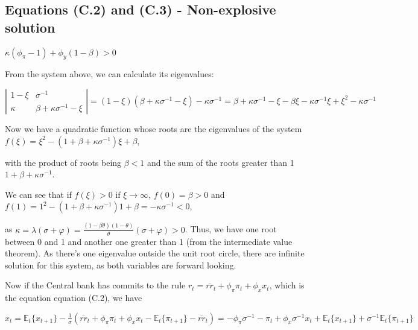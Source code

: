 \documentclass[
]{article}
\begin{document}
\vspace{12pt}

\hypertarget{equations-c.2-and-c.3---non-explosive-solution}{%
\subsection{Equations (C.2) and (C.3) - Non-explosive
solution}\label{equations-c.2-and-c.3---non-explosive-solution}}

\(\kappa (\phi_\pi-1)+\phi_y(1-\beta)>0\)

\vspace{8pt}

From the system above, we can calculate its eigenvalues:

\(\left| \begin{matrix} 1-\xi & \sigma^{-1} \\ \kappa & \beta +\kappa \sigma^{-1}-\xi \end{matrix} \right|=(1-\xi)(\beta +\kappa \sigma^{-1}-\xi)-\kappa \sigma^{-1}= \beta +\kappa \sigma^{-1}-\xi - \beta \xi -\kappa \sigma^{-1} \xi+\xi^2 -\kappa \sigma^{-1}\)

Now we have a quadratic function whose roots are the eigenvalues of the
system \(f(\xi)=\xi^2-(1+\beta+\kappa \sigma^{-1})\xi+\beta\),

with the product of roots being \(\beta<1\) and the sum of the roots
greater than 1 \(1+\beta+\kappa \sigma^{-1}\).

We can see that if \(f(\xi)>0\) if \(\xi \rightarrow \infty\),
\(f(0)=\beta>0\) and
\(f(1)=1^2-(1+\beta+\kappa \sigma^{-1})1+\beta=-\kappa \sigma^{-1}<0\),

as
\(\displaystyle \kappa=\lambda(\sigma+\varphi)=\frac{(1-\beta \theta)(1-\theta)}{\theta}(\sigma+\varphi)>0\).
Thus, we have one root between 0 and 1 and another one greater than 1
(from the intermediate value theorem). As there's one eigenvalue outside
the unit root circle, there are infinite solution for this system, as
both variables are forward looking.

Now if the Central bank has commits to the rule
\(r_t=\overline{rr}_t+\phi_\pi \pi_t+\phi_x x_t\), which is the equation
equation (C.2), we have

\(\displaystyle x_t = \mathbb{E}_t\{x_{t+1}\} -\frac{1}{\sigma}(\overline{rr}_t+\phi_\pi \pi_{t}+\phi_x x_t-\mathbb{E}_t\{\pi_{t+1}\} -\overline{rr}_t)= -\phi_\pi \sigma^{-1} -\pi_{t}+\phi_x \sigma^{-1} x_t + \mathbb{E}_t\{x_{t+1}\}+ \sigma^{-1}\mathbb{E}_t\{\pi_{t+1}\}\)
\end{document}
